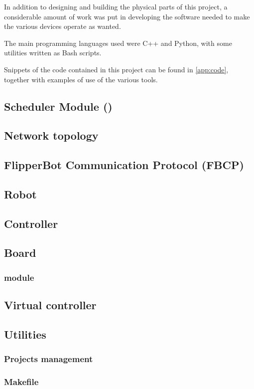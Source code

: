 In addition to designing and building the physical parts of this
project, a considerable amount of work was put in developing the
software needed to make the various devices operate as wanted.

The main programming languages used were C++ and Python, with some
utilities written as Bash scripts.

Snippets of the code contained in this project can be found in
\autoref{app:code}, together with examples of use of the various tools.


\subsection{Scheduler Module (\ScheMo{})}
  \label{ssec:schemo}
  

\subsection{Network topology}
  \label{ssec:network}
  

\subsection{FlipperBot Communication Protocol (FBCP)}
  \label{ssec:fbcp}
  
  
\subsection{Robot}
  \label{ssec:robot}
  
  
\subsection{Controller}
  \label{ssec:contr}
  
  
\subsection{Board}
  \label{ssec:board}
  
  \subsubsection{ module}
  
\subsection{Virtual controller}
  \label{ssec:vcontr}
  

\subsection{Utilities}
  \label{ssec:utils}
  
  \subsubsection{Projects management}
  \subsubsection{Makefile}
